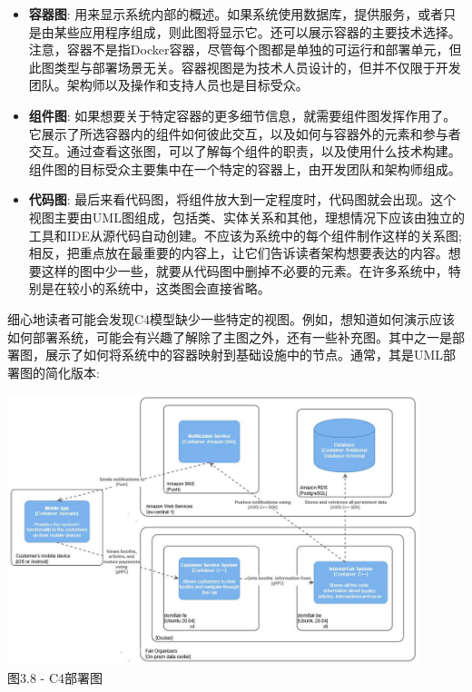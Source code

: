 \begin{itemize}
\item
\textbf{容器图}: 用来显示系统内部的概述。如果系统使用数据库，提供服务，或者只是由某些应用程序组成，则此图将显示它。还可以展示容器的主要技术选择。注意，容器不是指Docker容器，尽管每个图都是单独的可运行和部署单元，但此图类型与部署场景无关。容器视图是为技术人员设计的，但并不仅限于开发团队。架构师以及操作和支持人员也是目标受众。

\item 
\textbf{组件图}: 如果想要关于特定容器的更多细节信息，就需要组件图发挥作用了。它展示了所选容器内的组件如何彼此交互，以及如何与容器外的元素和参与者交互。通过查看这张图，可以了解每个组件的职责，以及使用什么技术构建。组件图的目标受众主要集中在一个特定的容器上，由开发团队和架构师组成。

\item
\textbf{代码图}: 最后来看代码图，将组件放大到一定程度时，代码图就会出现。这个视图主要由UML图组成，包括类、实体关系和其他，理想情况下应该由独立的工具和IDE从源代码自动创建。不应该为系统中的每个组件制作这样的关系图;相反，把重点放在最重要的内容上，让它们告诉读者架构想要表达的内容。想要这样的图中少一些，就要从代码图中删掉不必要的元素。在许多系统中，特别是在较小的系统中，这类图会直接省略。
\end{itemize}

细心地读者可能会发现C4模型缺少一些特定的视图。例如，想知道如何演示应该如何部署系统，可能会有兴趣了解除了主图之外，还有一些补充图。其中之一是部署图，展示了如何将系统中的容器映射到基础设施中的节点。通常，其是UML部署图的简化版本:

\begin{center}
\includegraphics[width=0.9\textwidth]{content/1/chapter3/images/8.jpg}\\
图3.8 - C4部署图
\end{center}


